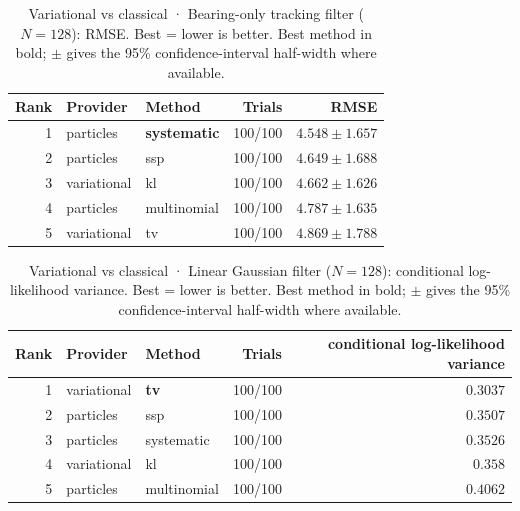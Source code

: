 \begin{table}[!htbp]
\centering
\small
\caption{Variational vs classical · Bearing-only tracking filter ($N=128$): RMSE. Best = lower is better. Best method in bold; $\pm$ gives the 95\% confidence-interval half-width where available.}
\label{tab:variational-vs-classical-bearing-only-tracking-filter-rmse}
\begin{tabular}{rllrr}
\toprule
Rank & Provider & Method & Trials & RMSE \\
\midrule
1 & particles & \textbf{systematic} & 100/100 & $\mathbf{4.548 \pm 1.657}$ \\
2 & particles & ssp & 100/100 & $4.649 \pm 1.688$ \\
3 & variational & kl & 100/100 & $4.662 \pm 1.626$ \\
4 & particles & multinomial & 100/100 & $4.787 \pm 1.635$ \\
5 & variational & tv & 100/100 & $4.869 \pm 1.788$ \\
\bottomrule
\end{tabular}
\end{table}


\begin{table}[!htbp]
\centering
\small
\caption{Variational vs classical · Linear Gaussian filter ($N=128$): conditional log-likelihood variance. Best = lower is better. Best method in bold; $\pm$ gives the 95\% confidence-interval half-width where available.}
\label{tab:variational-vs-classical-linear-gaussian-filter-conditional-loglik-variance}
\begin{tabular}{rllrr}
\toprule
Rank & Provider & Method & Trials & conditional log-likelihood variance \\
\midrule
1 & variational & \textbf{tv} & 100/100 & $\mathbf{0.3037}$ \\
2 & particles & ssp & 100/100 & $0.3507$ \\
3 & particles & systematic & 100/100 & $0.3526$ \\
4 & variational & kl & 100/100 & $0.358$ \\
5 & particles & multinomial & 100/100 & $0.4062$ \\
\bottomrule
\end{tabular}
\end{table}


